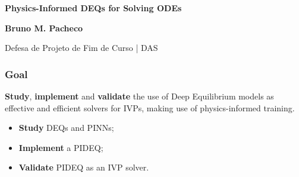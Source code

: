 \documentclass[t]{beamer}
\begin{document}
{
\begin{frame}[plain]
\vspace{18mm}
\begin{flushright}
\textcolor{cinza}{\textbf{\Large{
Physics-Informed DEQs for Solving ODEs
}}}
\end{flushright}

\vspace{-6mm}
\begin{flushright}
\textcolor{cinza}{\textbf{\scriptsize{
Bruno M. Pacheco
}}}
\end{flushright}

\vspace{-7mm}
\begin{flushright}
\textcolor{cinza}{\scriptsize{
Defesa de Projeto de Fim de Curso | DAS
}}
\end{flushright}


\end{frame}
}


\begin{frame}
\frametitle{Goal}
\textbf{Study}, \textbf{implement} and \textbf{validate} the use of Deep Equilibrium models as effective and efficient solvers for IVPs, making use of physics-informed training.

\begin{itemize}
    \item<2-> \textbf{Study} DEQs and PINNs;
    \item<3-> \textbf{Implement} a PIDEQ;
    \item<4-> \textbf{Validate} PIDEQ as an IVP solver.
\end{itemize}
\end{frame}
\end{document}
